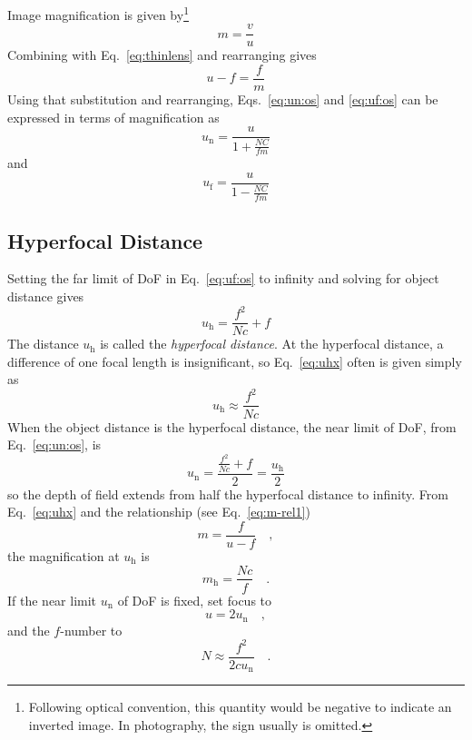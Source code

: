 \documentclass[11pt, oneside]{scrartcl}   	%
\begin{document}
Image magnification is given by\footnote{Following optical convention, this quantity would be negative to indicate an inverted image. In photography, the sign usually is omitted.}
\begin{equation}
      m=\frac v u
   \label{eq:mvu}
\end{equation}
Combining with Eq.~\ref{eq:thinlens} and rearranging gives
\begin{equation}
   \label{eq:m-rel1}
   u-f = \frac f m
\end{equation}
 Using that substitution and rearranging, Eqs.~\ref{eq:un:os} and \ref{eq:uf:os} can be expressed in terms of magnification as
\begin{equation}
      u_\mathrm{n}=\frac u{1+\frac{NC}{fm}}
   \label{eq:un2}
\end{equation}
and
\begin{equation}
      u_\mathrm{f}=\frac u{1-\frac{NC}{fm}}
   \label{eq:uf2}
\end{equation}

\subsection{Hyperfocal Distance}

Setting the far limit of DoF in Eq.~\ref{eq:uf:os} to infinity and solving for object distance gives
\begin{equation}
   u_\mathrm{h} = \frac{f^2}{N\!c}+f
   \label{eq:uhx}
\end{equation}
The distance $u_\mathrm{h}$ is called the \emph{hyperfocal distance}. At the hyperfocal distance, a difference of
one focal length is insignificant, so Eq.~\ref{eq:uhx} often is given simply as
\begin{equation}
  u_\mathrm{h} \approx \frac{f^2}{N\!c}
  \label{eq:uhapprox}
\end{equation}
When the object distance is the hyperfocal distance, the near limit of DoF, from Eq.~\ref{eq:un:os}, is 
\begin{equation}
u_\mathrm{n} = \frac{\frac{f^2}{N\!c}+f}2 = \frac{u_\mathrm{h}}2
\end{equation}
so the depth of field extends from half the hyperfocal distance to infinity. From Eq.~\ref{eq:uhx}  and the relationship (see Eq.~\ref{eq:m-rel1})
\begin{equation}
   m = \frac f{u-f}\quad,
   \label{eq:m-rel2}
\end{equation}
the magnification at $u_\mathrm{h}$ is
\begin{equation}
   m_\mathrm{h} = \frac{N\!c}f\quad.
\end{equation}
If the near limit $u_\mathrm{n}$ of DoF is fixed,  set focus to
\begin{equation}
   u = 2 u_\mathrm{n}\quad ,
   \label{eq:unearfix}
\end{equation}
and the $f$-number to
\begin{equation}
  N\approx \frac{f^2}{2cu_\mathrm{n}}\quad .
   \label{eq:unearfix}
\end{equation}
\end{document}
